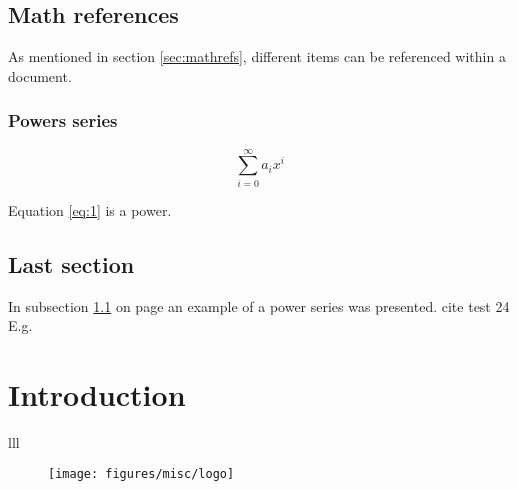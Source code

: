\documentclass{article}
\begin{document}
\section{Math references}
\label{mathrefs}
As mentioned in section \ref{sec:mathrefs}, different items can be referenced within a document.

\subsection{Powers series}
		\label{sec:subsection}

		\begin{equation}
	\label{eq:1}
\sum_{i=0}^{\infty} a_i x^i
\end{equation}

Equation \ref{eq:1} is a power.
\vspace{0.5cm}


\section{Last section}
In subsection \ref{sec:subsection} on page \pageref{eq:1} an example of a power series was presented.
cite test 24 E.g.


\chapter{Introduction} %


\begin{symbols}{lll} %
\end{symbols}

\begin{figure}[h!]
	\texttt{[image: figures/misc/logo]}
\end{figure}
\end{document}
